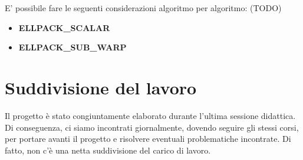\documentclass{article}
\begin{document}
E' possibile fare le seguenti considerazioni algoritmo per algoritmo:
(TODO)
\begin{itemize}
    \item \textbf{ELLPACK\_SCALAR}
    \item \textbf{ELLPACK\_SUB\_WARP}
\end{itemize}

\section{Suddivisione del lavoro}
Il progetto è stato congiuntamente elaborato durante l'ultima sessione didattica. Di conseguenza, ci siamo incontrati giornalmente, dovendo seguire gli stessi corsi, per portare avanti il progetto e risolvere eventuali problematiche incontrate. Di fatto, non c'è una netta suddivisione del carico di lavoro.
\end{document}
